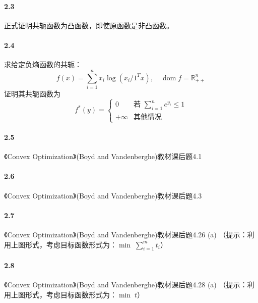 \documentclass[12pt,a4paper]{article}
\begin{document}
\paragraph{2.3} 正式证明共轭函数为凸函数，即使原函数是非凸函数。

\paragraph{2.4} 求给定负熵函数的共轭：
\[
  f(x) = \sum_{i=1}^n x_i \log(x_i / 1^T x), \quad \operatorname{dom} f = \mathbb{R}_{++}^n
\]
证明其共轭函数为
\[
  f^*(y) =
  \begin{cases}
    0 & \text{若 } \sum_{i=1}^n e^{y_i} \leq 1 \\
    +\infty & \text{其他情况}
  \end{cases}
\]




\paragraph{2.5} 《Convex Optimization》(Boyd and Vandenberghe)教材课后题4.1

\paragraph{2.6} 《Convex Optimization》(Boyd and Vandenberghe)教材课后题4.3

\paragraph{2.7} 《Convex Optimization》(Boyd and Vandenberghe)教材课后题4.26 (a) （提示：利用上图形式，考虑目标函数形式为：$\min \; \sum_{i=1}^m t_i$）


\paragraph{2.8} 《Convex Optimization》(Boyd and Vandenberghe)教材课后题4.28 (a) （提示：利用上图形式，考虑目标函数形式为：$\min \; t$）
\end{document}

